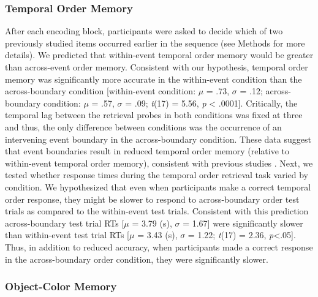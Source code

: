 \subsubsection{Temporal Order Memory}\label{temporal-order-memory}

After each encoding block, participants were asked to decide which of
two previously studied items occurred earlier in the sequence (see
Methods for more details). We predicted that within-event temporal order
memory would be greater than across-event order memory. Consistent with
our hypothesis, temporal order memory was significantly more accurate in
the within-event condition than the across-boundary condition
{[}within-event condition: \(\mu\) = .73, \(\sigma\) = .12;
across-boundary condition: \(\mu\) = .57, \(\sigma\) = .09; \emph{t}(17)
= 5.56, \emph{p} \textless{} .0001{]}. Critically, the temporal lag
between the retrieval probes in both conditions was fixed at three and
thus, the only difference between conditions was the occurrence of an
intervening event boundary in the across-boundary condition. These data
suggest that event boundaries result in reduced temporal order memory
(relative to within-event temporal order memory), consistent with
previous studies
\autocites{dubrow_influence_2013}{dubrow_temporal_2014}. Next, we tested
whether response times during the temporal order retrieval task varied
by condition. We hypothesized that even when participants make a correct
temporal order response, they might be slower to respond to
across-boundary order test trials as compared to the within-event test
trials. Consistent with this prediction across-boundary test trial RTs
{[}\(\mu\) = 3.79 (s), \(\sigma\) = 1.67{]} were significantly slower
than within-event test trial RTs {[}\(\mu\) = 3.43 (s), \(\sigma\) =
1.22; \emph{t}(17) = 2.36, \emph{p}\textless{}.05{]}. Thus, in addition
to reduced accuracy, when participants made a correct response in the
across-boundary order condition, they were significantly slower.

\subsubsection{Object-Color Memory}\label{object-color-memory}

